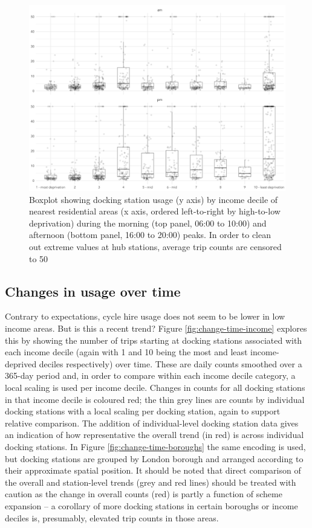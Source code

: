 \documentclass[]{article}
\begin{document}
\begin{figure}

{\centering \includegraphics[width=0.7\linewidth]{figures/income-decile-am-pm-boxplot_minor} 

}

\caption{Boxplot showing docking station usage (y axis) by income decile of nearest residential areas (x axis, ordered left-to-right by high-to-low deprivation) during the morning (top panel, 06:00 to 10:00) and afternoon (bottom panel, 16:00 to 20:00) peaks. In order to clean out extreme values at hub stations, average trip counts are censored to 50}\label{fig:income-decile-am-pm-beeswarm}
\end{figure}

\hypertarget{changes-in-usage-over-time}{%
\subsection{Changes in usage over time}\label{changes-in-usage-over-time}}

Contrary to expectations, cycle hire usage does not seem to be lower in low income areas.
But is this a recent trend?
Figure \ref{fig:change-time-income} explores this by showing the number of trips starting at docking stations associated with each income decile (again with 1 and 10 being the most and least income-deprived deciles respectively) over time.
These are daily counts smoothed over a 365-day period and, in order to compare within each income decile category, a local scaling is used per income decile.
Changes in counts for all docking stations in that income decile is coloured red; the thin grey lines are counts by individual docking stations with a local scaling per docking station, again to support relative comparison.
The addition of individual-level docking station data gives an indication of how representative the overall trend (in red) is across individual docking stations. In Figure \ref{fig:change-time-boroughs} the same encoding is used, but docking stations are grouped by London borough and arranged according to their approximate spatial position. It should be noted that direct comparison of the overall and station-level trends (grey and red lines) should be treated with caution as the change in overall counts (red) is partly a function of scheme expansion -- a corollary of more docking stations in certain boroughs or income deciles is, presumably, elevated trip counts in those areas.
\end{document}
